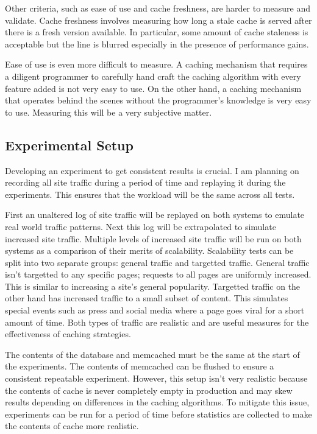 \documentclass[12pt]{ucthesis}
\begin{document}
Other criteria, such as ease of use and cache freshness, are harder to measure and validate.
Cache freshness involves measuring how long a stale cache is served after there is a fresh version available.
In particular, some amount of cache staleness is acceptable but the line is blurred especially in the presence of performance gains.

Ease of use is even more difficult to measure.
A caching mechanism that requires a diligent programmer to carefully hand craft the caching algorithm with every feature added is not very easy to use.
On the other hand, a caching mechanism that operates behind the scenes without the programmer's knowledge is very easy to use.
Measuring this will be a very subjective matter.

\subsection{Experimental Setup}
Developing an experiment to get consistent results is crucial.
I am planning on recording all site traffic during a period of time and replaying it during the experiments.
This ensures that the workload will be the same across all tests.

First an unaltered log of site traffic will be replayed on both systems to emulate real world traffic patterns.
Next this log will be extrapolated to simulate increased site traffic.
Multiple levels of increased site traffic will be run on both systems as a comparison of their merits of scalability.
Scalability tests can be split into two separate groups: general traffic and targetted traffic.
General traffic isn't targetted to any specific pages; requests to all pages are uniformly increased.
This is similar to increasing a site's general popularity.
Targetted traffic on the other hand has increased traffic to a small subset of content.
This simulates special events such as press and social media where a page goes viral for a short amount of time.
Both types of traffic are realistic and are useful measures for the effectiveness of caching strategies.

The contents of the database and memcached must be the same at the start of the experiments.
The contents of memcached can be flushed to ensure a consistent repeatable experiment.
However, this setup isn't very realistic because the contents of cache is never completely empty in production and may skew results depending on differences in the caching algorithms.
To mitigate this issue, experiments can be run for a period of time before statistics are collected to make the contents of cache more realistic.
\end{document}
